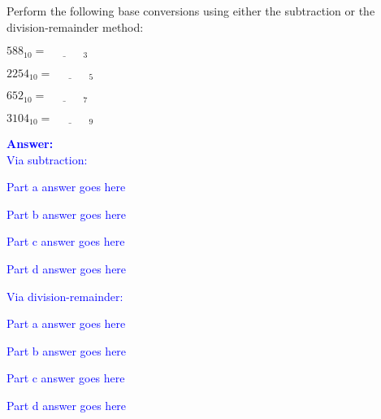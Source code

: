 \item{}
Perform the following base conversions using either the subtraction or
the division-remainder method:
\begin{list}{\textbf{}}{}
    \item $588_{10}=\underline{\phantom{123456}}\,_{3}$
    \item $2254_{10}=\underline{\phantom{123456}}\,_{5}$
    \item $652_{10}=\underline{\phantom{123456}}\,_{7}$
    \item $3104_{10}=\underline{\phantom{123456}}\,_{9}$
\end{list}
\vskip12pt
\ifanswers
\textcolor{blue}{
\textbf{Answer:}\\
Via subtraction:
\begin{list}{\textbf{}}{}
    \item Part a answer goes here
    \item Part b answer goes here
    \item Part c answer goes here
    \item Part d answer goes here
\end{list}
\vskip12pt
Via division-remainder:
\begin{list}{\textbf{}}{}
    \item Part a answer goes here
    \item Part b answer goes here
    \item Part c answer goes here
    \item Part d answer goes here
\end{list}
}
\newpage
\fi

